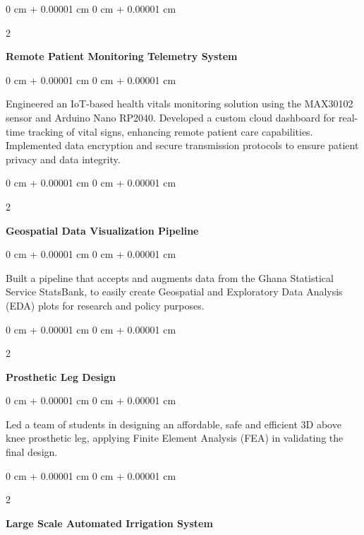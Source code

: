 \documentclass[10pt, letterpaper]{article}
\newenvironment{onecolentry}{
    \begin{adjustwidth}{
        0 cm + 0.00001 cm
    }{
        0 cm + 0.00001 cm
    }
}{
    \end{adjustwidth}
} %
\newenvironment{twocolentry}[2][]{
    \onecolentry
    \def\secondColumn{#2}
    \setcolumnwidth{\fill, 4.5 cm}
    \begin{paracol}{2}
}{
    \switchcolumn \raggedleft \secondColumn
    \end{paracol}
    \endonecolentry
} %
\begin{document}
    \vspace{0.2 cm}

    \begin{twocolentry}{
    }
        \textbf{Remote Patient Monitoring Telemetry System}
    \end{twocolentry}

    \vspace{0.10 cm}
    \begin{onecolentry}
        Engineered an IoT-based health vitals monitoring solution using the MAX30102 sensor and Arduino Nano RP2040. Developed a custom cloud dashboard for real-time tracking of vital signs, enhancing remote patient care capabilities. Implemented data encryption and secure transmission protocols to ensure patient privacy and data integrity.
    \end{onecolentry}

    \vspace{0.2 cm}

    \begin{twocolentry}{
    }
        \textbf{Geospatial Data Visualization Pipeline}
    \end{twocolentry}

    \vspace{0.10 cm}
    \begin{onecolentry}
        Built a pipeline that accepts and augments data from the Ghana Statistical Service StatsBank, to easily create Geospatial and Exploratory Data Analysis (EDA) plots for research and policy purposes.
    \end{onecolentry}

    \vspace{0.2 cm}

    \begin{twocolentry}{
    }
        \textbf{Prosthetic Leg Design}
    \end{twocolentry}

    \vspace{0.10 cm}
    \begin{onecolentry}
        Led a team of students in designing an affordable, safe and efficient 3D above knee prosthetic leg, applying Finite Element Analysis (FEA) in validating the final design.
    \end{onecolentry}

    \vspace{0.2 cm}

    \begin{twocolentry}{
    }
        \textbf{Large Scale Automated Irrigation System}
    \end{twocolentry}
\end{document}
